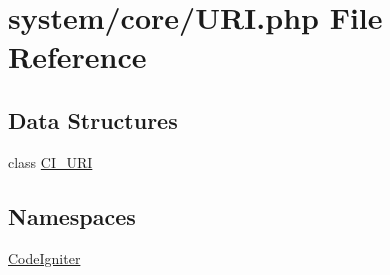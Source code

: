 \hypertarget{_u_r_i_8php}{}\section{system/core/\+U\+RI.php File Reference}
\label{_u_r_i_8php}
\subsection*{Data Structures}
\begin{DoxyCompactItemize}
\item 
class \mbox{\hyperlink{class_c_i___u_r_i}{C\+I\+\_\+\+U\+RI}}
\end{DoxyCompactItemize}
\subsection*{Namespaces}
\begin{DoxyCompactItemize}
\item 
 \mbox{\hyperlink{namespace_code_igniter}{Code\+Igniter}}
\end{DoxyCompactItemize}
